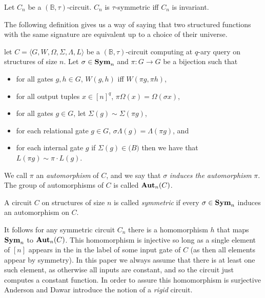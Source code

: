 \documentclass[../paper.tex]{subfiles}
\begin{document}
\begin{lem}
  Let $C_n$ be a $(\mathbb{B}, \tau)$-circuit. $C_n$ is $\tau$-symmetric iff
  $C_n$ is invariant.
\end{lem}

The following definition gives us a way of saying that two structured functions
with the same signature are equivalent up to a choice of their universe.

\begin{definition}[Automorphism]
  let $C = \langle G, W, \Omega, \Sigma, \Lambda, L\rangle$ be a
  $(\mathbb{B},\tau)$-circuit computing at $q$-ary query on structures of size
  $n$. Let $\sigma \in \text{\textbf{Sym}}_n$ and $\pi: G \rightarrow G$ be a bijection such
  that
  \begin{itemize}
    \setlength\itemsep{0mm}
  \item for all gates $g, h \in G$, $W(g,h)$ iff $W(\pi g, \pi h)$,
  \item for all output tuples $x \in [n]^q$, $\pi \Omega (x) = \Omega (\sigma
    x)$,
  \item for all gates $g \in G$, let $\Sigma (g) \sim \Sigma (\pi g)$,
  \item for each relational gate $g \in G$, $\sigma \Lambda (g) = \Lambda (\pi
    g)$, and
  \item for each internal gate $g$ if $\Sigma (g) \in \mathbb(B)$ then we have
    that $L(\pi g) \sim \pi \cdot L(g)$.
  \end{itemize}

  We call $\pi$ an \emph{automorphism} of $C$, and we say that $\sigma$
  \emph{induces the automorphism} $\pi$. The group of automorphisms of $C$ is
  called $\text{\textbf{Aut}}_n (C)$.
\end{definition}

\begin{definition}[Symmetry]
  A circuit $C$ on structures of size $n$ is called \emph{symmetric} if every
  $\sigma \in \text{\textbf{Sym}}_n$ induces an automorphism on $C$.
\end{definition}

It follows for any symmetric circuit $C_n$ there is a homomorphism $h$ that maps
$\text{\textbf{Sym}}_n$ to $\text{\textbf{Aut}}_n(C)$. This homomorphism is injective so long as a single
element of $[n]$ appears in the in the label of some input gate of $C$ (as then
all elements appear by symmetry)\cite{AndersonD17}. In this paper we always
assume that there is at least one such element, as otherwise all inputs are
constant, and so the circuit just computes a constant function. In order to
assure this homomorphism is surjective Anderson and Dawar \cite{AndersonD17}
introduce the notion of a \emph{rigid} circuit.
\end{document}
